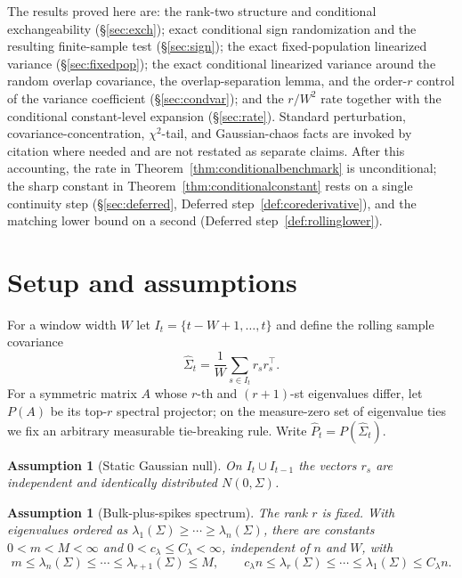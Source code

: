 \documentclass[11pt]{article}
\theoremstyle{tightplain}
\theoremstyle{tightdef}
\newtheorem{assumption}[theorem]{Assumption}
\newcommand{\Phat}{\widehat P}
\begin{document}
The results proved here are: the rank-two structure and conditional exchangeability
(\S\ref{sec:exch}); exact conditional sign randomization and the resulting
finite-sample test (\S\ref{sec:sign}); the exact fixed-population linearized variance
(\S\ref{sec:fixedpop}); the exact conditional linearized variance around the random
overlap covariance, the overlap-separation lemma, and the order-$r$ control of the
variance coefficient (\S\ref{sec:condvar}); and the $r/W^2$ rate together with the
conditional constant-level expansion (\S\ref{sec:rate}). Standard perturbation,
covariance-concentration, $\chi^2$-tail, and Gaussian-chaos facts are invoked by
citation where needed and are not restated as separate claims. After this accounting,
the rate in Theorem~\ref{thm:conditionalbenchmark} is unconditional; the sharp
constant in Theorem~\ref{thm:conditionalconstant} rests on a single continuity step
(\S\ref{sec:deferred}, Deferred step~\ref{def:corederivative}), and the matching lower
bound on a second (Deferred step~\ref{def:rollinglower}).

\section{Setup and assumptions}

For a window width $W$ let $I_t=\{t-W+1,\ldots,t\}$ and define the rolling sample
covariance
\[
\widehat\Sigma_t=\frac1W\sum_{s\in I_t}r_s r_s^\top .
\]
For a symmetric matrix $A$ whose $r$-th and $(r+1)$-st eigenvalues differ, let $P(A)$
be its top-$r$ spectral projector; on the measure-zero set of eigenvalue ties we fix
an arbitrary measurable tie-breaking rule. Write $\Phat_t=P(\widehat\Sigma_t)$.

\begin{assumption}[Static Gaussian null]\label{ass:gaussian}
On $I_t\cup I_{t-1}$ the vectors $r_s$ are independent and identically distributed
$N(0,\Sigma)$.
\end{assumption}

\begin{assumption}[Bulk-plus-spikes spectrum]\label{ass:bulkspike}
The rank $r$ is fixed. With eigenvalues ordered as
$\lambda_1(\Sigma)\ge\cdots\ge\lambda_n(\Sigma)$, there are constants
$0<m<M<\infty$ and $0<c_\lambda\le C_\lambda<\infty$, independent of $n$ and $W$,
with
\[
m\le \lambda_n(\Sigma)\le\cdots\le\lambda_{r+1}(\Sigma)\le M,
\qquad
c_\lambda n\le \lambda_r(\Sigma)\le\cdots\le\lambda_1(\Sigma)\le C_\lambda n .
\]
\end{assumption}
\end{document}
